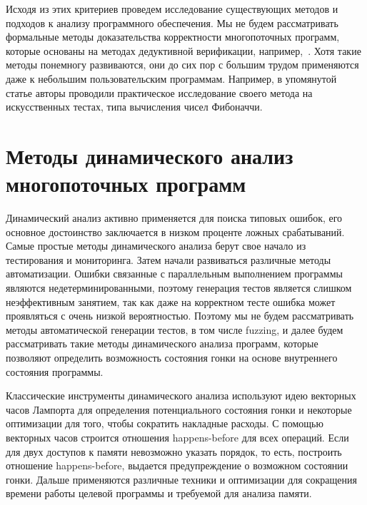 Исходя из этих критериев проведем исследование существующих методов и подходов к анализу программного обеспечения.
Мы не будем рассматривать формальные методы доказательства корректности многопоточных программ, которые основаны на методах дедуктивной верификации, например,~\cite{Le:2015:TRC}.
Хотя такие методы понемногу развиваются, они до сих пор с большим трудом применяются даже к небольшим пользовательским программам. 
Например, в упомянутой статье авторы проводили практическое исследование своего метода на искусственных тестах, типа вычисления чисел Фибоначчи.

\section{Методы динамического анализ многопоточных программ}
\label{rw:dynamic}

Динамический анализ активно применяется для поиска типовых ошибок, его основное достоинство заключается в низком проценте ложных срабатываний.
Самые простые методы динамического анализа берут свое начало из тестирования и мониторинга.
Затем начали развиваться различные методы автоматизации.
Ошибки связанные с параллельным выполнением программы являются недетерминированными, поэтому генерация тестов является слишком неэффективным занятием, так как даже на корректном тесте ошибка может проявляться с очень низкой вероятностью.
Поэтому мы не будем рассматривать методы автоматической генерации тестов, в том числе fuzzing, и далее будем рассматривать такие методы динамического анализа программ, которые позволяют определить возможность состояния гонки на основе внутреннего состояния программы.

Классические инструменты динамического анализа используют идею векторных часов Лампорта для определения потенциального состояния гонки и некоторые оптимизации для того, чтобы сократить накладные расходы.
С помощью векторных часов строится отношения happens-before для всех операций.
Если для двух доступов к памяти невозможно указать порядок, то есть, построить отношение happens-before, выдается предупреждение о возможном состоянии гонки. 
Дальше применяются различные техники и оптимизации для сокращения времени работы целевой программы и требуемой для анализа памяти.


